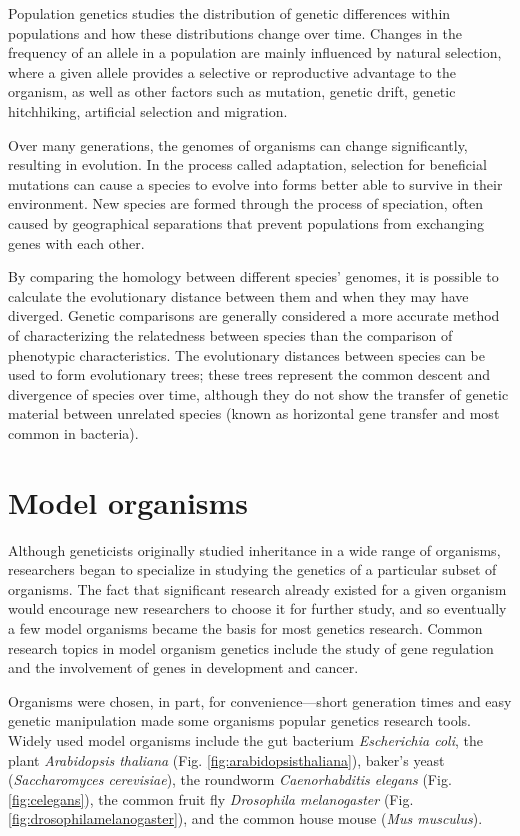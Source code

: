 Population genetics studies the distribution of genetic differences within populations and how these distributions change over time. Changes in the frequency of an allele in a population are mainly influenced by natural selection, where a given allele provides a selective or reproductive advantage to the organism, as well as other factors such as mutation, genetic drift, genetic hitchhiking, artificial selection and migration.

Over many generations, the genomes of organisms can change significantly, resulting in evolution. In the process called adaptation, selection for beneficial mutations can cause a species to evolve into forms better able to survive in their environment. New species are formed through the process of speciation, often caused by geographical separations that prevent populations from exchanging genes with each other.

By comparing the homology between different species' genomes, it is possible to calculate the evolutionary distance between them and when they may have diverged. Genetic comparisons are generally considered a more accurate method of characterizing the relatedness between species than the comparison of phenotypic characteristics. The evolutionary distances between species can be used to form evolutionary trees; these trees represent the common descent and divergence of species over time, although they do not show the transfer of genetic material between unrelated species (known as horizontal gene transfer and most common in bacteria).

\hypertarget{model-organisms}{%
\section{Model organisms}\label{model-organisms}}

Although geneticists originally studied inheritance in a wide range of organisms, researchers began to specialize in studying the genetics of a particular subset of organisms. The fact that significant research already existed for a given organism would encourage new researchers to choose it for further study, and so eventually a few model organisms became the basis for most genetics research. Common research topics in model organism genetics include the study of gene regulation and the involvement of genes in development and cancer.

Organisms were chosen, in part, for convenience---short generation times and easy genetic manipulation made some organisms popular genetics research tools. Widely used model organisms include the gut bacterium \emph{Escherichia coli}, the plant \emph{Arabidopsis thaliana} (Fig. \ref{fig:arabidopsisthaliana}), baker's yeast (\emph{Saccharomyces cerevisiae}), the roundworm \emph{Caenorhabditis elegans} (Fig. \ref{fig:celegans}), the common fruit fly \emph{Drosophila melanogaster} (Fig. \ref{fig:drosophilamelanogaster}), and the common house mouse (\emph{Mus musculus}).



